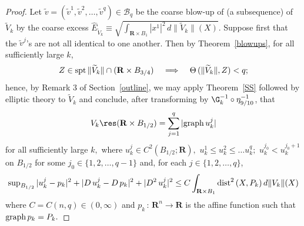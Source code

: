 \documentclass[a4paper,11pt]{amsart}
\begin{document}
\begin{proof}
Let $\widetilde{v} = (\widetilde{v}^{1}, \widetilde{v}^{2}, \ldots, \widetilde{v}^{q})  \in {\mathcal B}_{q}$ be the coarse blow-up of (a subsequence) of $\widetilde{V}_{k}$ by the coarse excess ${\hat E}_{\widetilde{V}_{k}} \equiv \sqrt{\int_{{\mathbf R} \times B_{1}} |x^{1}|^{2} \, d\|\widetilde{V}_{k}\|(X)}$. Suppose first that the $\widetilde{v}^{j}$'s are not all identical to one another. Then by Theorem~\ref{blowups}, for all sufficiently large $k$,
$$Z \in {\rm spt} \, \|\widetilde{V}_{k}\| \cap ({\mathbf R} \times B_{3/4}) \;\;\; \implies \;\;\; \Theta \, (\|\widetilde{V}_{k}\|, Z) < q;$$  
hence, by Remark 3 of Section~\ref{outline}, we may apply Theorem~\ref{SS} followed by elliptic theory to $\widetilde{V}_{k}$ and conclude, after transforming by $\G_{k}^{-1} \circ \eta_{9/10}^{-1}$, that 
$$V_{k} \res ({\mathbf R} \times B_{1/2}) = \sum_{j=1}^{q} |{\rm graph} \, u_{k}^{j}|$$
for all sufficiently large $k,$  where $u_{k}^{j} \in C^{2}(B_{1/2}; {\mathbf R}),$ $u_{k}^{1} \leq u_{k}^{2} \leq \ldots u_{k}^{q};$ $u_{k}^{j_{0}} < u_{k}^{j_{0}+1}$ on $B_{1/2}$ for some $j_{0} \in \{1, 2, \ldots, q-1\}$ and, for each $j \in \{1, 2, \ldots, q\}$,  
$${\rm sup}_{B_{1/2}} \, |u_{k}^{j} - p_{k}|^{2} + |D \, u_{k}^{j} - D \, p_{k}|^{2} + |D^{2} \, u_{k}^{j}|^{2} \leq C\int_{{\mathbf R} \times B_{1}} {\rm dist}^{2} \, (X, P_{k}) \, d\|V_{k}\|(X)$$
where $C = C(n, q) \in (0, \infty)$ and $p_{k} \, : \, {\mathbf R}^{n} \to {\mathbf R}$ is the affine function such that ${\rm graph} \,  p_{k} = P_{k}.$



\end{proof}
\end{document}
